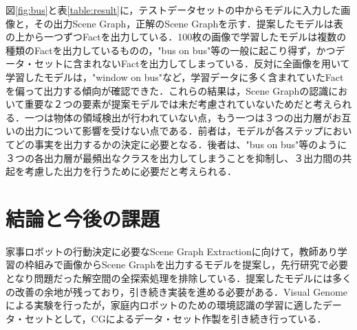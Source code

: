 図\ref{fig:bus}と表\ref{table:result}に，テストデータセットの中からモデルに入力した画像と，その出力Scene Graph，正解のScene Graphを示す．提案したモデルは表の上から一つずつFactを出力している．100枚の画像で学習したモデルは複数の種類のFactを出力しているものの，"bus on bus"等の一般に起こり得ず，かつデータ・セットに含まれないFactを出力してしまっている．反対に全画像を用いて学習したモデルは，"window on bus"など，学習データに多く含まれていたFactを偏って出力する傾向が確認できた．これらの結果は，Scene Graphの認識において重要な２つの要素が提案モデルでは未だ考慮されていないためだと考えられる．一つは物体の領域検出が行われていない点，もう一つは３つの出力層がお互いの出力について影響を受けない点である．前者は，モデルが各ステップにおいてどの事実を出力するかの決定に必要となる．後者は、"bus on bus"等のように３つの各出力層が最頻出なクラスを出力してしまうことを抑制し、３出力間の共起を考慮した出力を行うために必要だと考えられる．
\section{結論と今後の課題}
家事ロボットの行動決定に必要なScene Graph Extractionに向けて，教師あり学習の枠組みで画像からScene Graphを出力するモデルを提案し，先行研究で必要となり問題だった解空間の全探索処理を排除している．提案したモデルには多くの改善の余地が残っており，引き続き実装を進める必要がある．Visual Genomeによる実験を行ったが，家庭内ロボットのための環境認識の学習に適したデータ・セットとして，CGによるデータ・セット作製を引き続き行っている．



